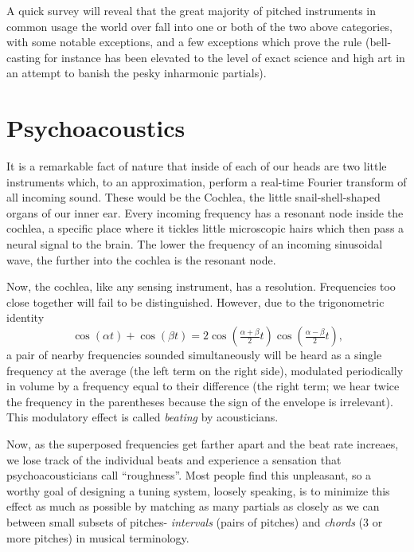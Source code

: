 \documentclass[12pt]{article}
\begin{document}
A quick survey will reveal that the great majority of pitched instruments in common usage the world over fall into one or both of the two above categories, with some notable exceptions, and a few exceptions which prove the rule (bell-casting for instance has been elevated to the level of exact science and high art in an attempt to banish the pesky inharmonic partials).


\section{Psychoacoustics}
\par
It is a remarkable fact of nature that inside of each of our heads are two little instruments which, to an approximation, perform a real-time Fourier transform of all incoming sound.  These would be the Cochlea, the little snail-shell-shaped organs of our inner ear.  Every incoming frequency has a resonant node inside the cochlea, a specific place where it tickles little microscopic hairs which then pass a neural signal to the brain.  The lower the frequency of an incoming sinusoidal wave, the further into the cochlea is the resonant node. \\
\par 
Now, the cochlea, like any sensing instrument, has a resolution.  Frequencies too close together will fail to be distinguished.  However, due to the trigonometric identity
\[ \cos (\alpha t)+ \cos (\beta t) = 2\cos(\tfrac{\alpha+\beta}{2} t)\cos(\tfrac{\alpha-\beta}{2}t)\text{,} \]
a pair of nearby frequencies sounded simultaneously will be heard as a single frequency at the average (the left term on the right side), modulated periodically in volume by a frequency equal to their difference (the right term; we hear twice the frequency in the parentheses because the sign of the envelope is irrelevant).  This modulatory effect is called \emph{beating} by acousticians.\\
\par
Now, as the superposed frequencies get farther apart and the beat rate increaes, we lose track of the individual beats and experience a sensation that psychoacousticians call ``roughness''.  Most people find this unpleasant, so a worthy goal of designing a tuning system, loosely speaking, is to minimize this effect as much as possible by matching as many partials as closely as we can between small subsets of pitches- \emph{intervals} (pairs of pitches) and \emph{chords} (3 or more pitches) in musical terminology.
\end{document}
